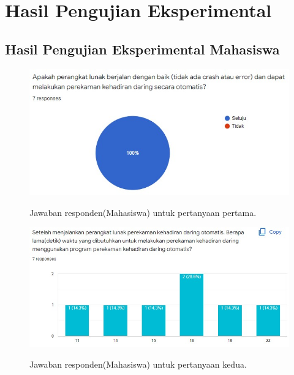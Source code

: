 \chapter{Hasil Pengujian Eksperimental}
\label{lamp:C}

%
%
%
\section{Hasil Pengujian Eksperimental Mahasiswa}
\begin{figure}[H]
	\centering
	\includegraphics[scale=0.75]{Gambar/SurveiMahasiswa1.jpg}
	\label{}
	\caption{Jawaban responden(Mahasiswa) untuk pertanyaan pertama.}
\end{figure}

\begin{figure}[H]
	\centering
	\includegraphics[scale=0.75]{Gambar/SurveiMahasiswa2.jpg}
	\label{}
	\caption{Jawaban responden(Mahasiswa) untuk pertanyaan kedua.}
\end{figure}
	

